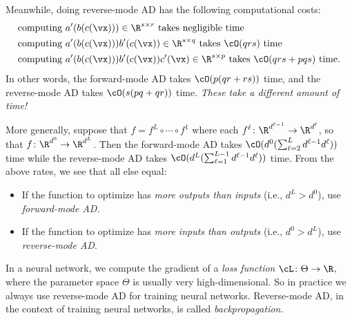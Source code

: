 \documentclass[../../book-main.tex]{subfiles}
\begin{document}
Meanwhile, doing reverse-mode AD has the following computational costs:
\begin{align}
    &\text{computing}\ a^{\prime}(b(c(\vx))) \in \R^{s \times r}\ \text{takes negligible time} \\
    &\text{computing}\ a^{\prime}(b(c(\vx)))b^{\prime}(c(\vx)) \in \R^{s \times q}\ \text{takes \(\cO(qrs)\) time} \\
    &\text{computing}\ a^{\prime}(b(c(\vx)))b^{\prime}(c(\vx))c^{\prime}(\vx) \in \R^{s \times p}\ \text{takes \(\cO(qrs + pqs)\) time.}
\end{align}
In other words, the forward-mode AD takes \(\cO(p(qr + rs))\) time, and the reverse-mode AD takes \(\cO(s(pq + qr))\) time. \textit{These take a different amount of time!} 

More generally, suppose that \(f = f^{L} \circ \cdots \circ f^{1}\) where each \(f^{\ell} \colon \R^{d^{\ell - 1}} \to \R^{d^{\ell}}\), so that \(f \colon \R^{d^{0}} \to \R^{d^{L}}\). Then the forward-mode AD takes \(\cO(d^{0}(\sum_{\ell = 2}^{L}d^{\ell - 1}d^{\ell}))\) time while the reverse-mode AD takes \(\cO(d^{L}(\sum_{\ell = 1}^{L - 1}d^{\ell - 1}d^{\ell}))\) time. From the above rates, we see that all else equal:
\begin{itemize}
    \item If the function to optimize has \textit{more outputs than inputs} (i.e., \(d^{L} > d^{0}\)), use \textit{forward-mode AD}.
    \item If the function to optimize has \textit{more inputs than outputs} (i.e., \(d^{0} > d^{L}\)), use \textit{reverse-mode AD}.
\end{itemize}
In a neural network, we compute the gradient of a \textit{loss function} \(\cL \colon \Theta \to \R\), where the parameter space \(\Theta\) is usually very high-dimensional. So in practice we always use reverse-mode AD for training neural networks. Reverse-mode AD, in the context of training neural networks, is called \textit{backpropagation}.
\end{document}
